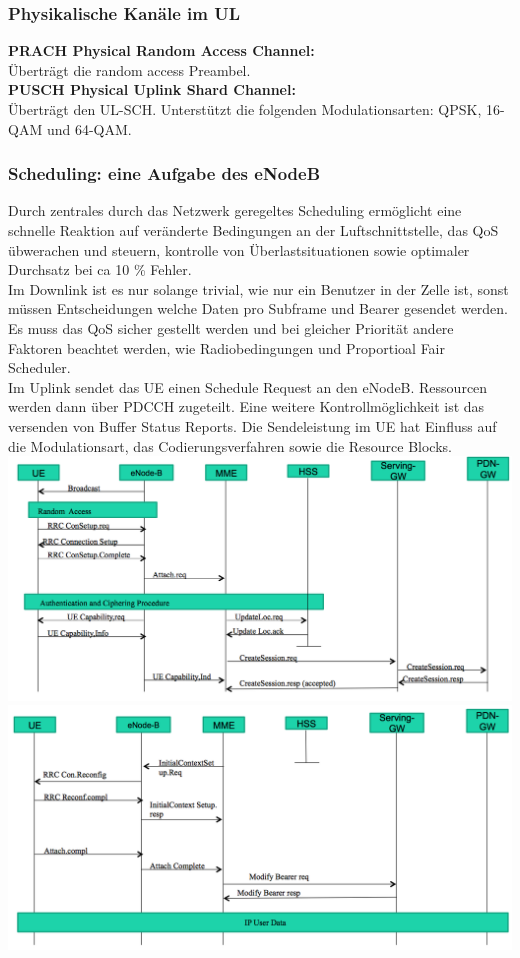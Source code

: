 \subsubsection{Physikalische Kanäle im UL}
\textbf{PRACH Physical Random Access Channel: } \\
Überträgt die random access Preambel. \\
\textbf{PUSCH Physical Uplink Shard Channel: } \\
Überträgt den UL-SCH. Unterstützt die folgenden Modulationsarten: QPSK, 16-QAM und 64-QAM. \\
\subsubsection{Scheduling: eine Aufgabe des eNodeB}
Durch zentrales durch das Netzwerk geregeltes Scheduling ermöglicht eine schnelle Reaktion auf veränderte Bedingungen an der Luftschnittstelle, das QoS übwerachen und steuern, kontrolle von Überlastsituationen sowie optimaler Durchsatz bei ca 10 \% Fehler. \\
Im Downlink ist es nur solange trivial, wie nur ein Benutzer in der Zelle ist, sonst müssen Entscheidungen welche Daten pro Subframe und Bearer gesendet werden. Es muss das QoS sicher gestellt werden und bei gleicher Priorität andere Faktoren beachtet werden, wie Radiobedingungen und Proportioal Fair Scheduler. \\
Im Uplink sendet das UE einen Schedule Request an den eNodeB. Ressourcen werden dann über PDCCH zugeteilt. Eine weitere Kontrollmöglichkeit ist das versenden von Buffer Status Reports. Die Sendeleistung im UE hat Einfluss auf die Modulationsart, das Codierungsverfahren sowie die Resource Blocks. \\
\includegraphics[width = 0.8 \linewidth]{./Pics/db1.png}\\
\includegraphics[width = 0.8 \linewidth]{./Pics/db2.png}
